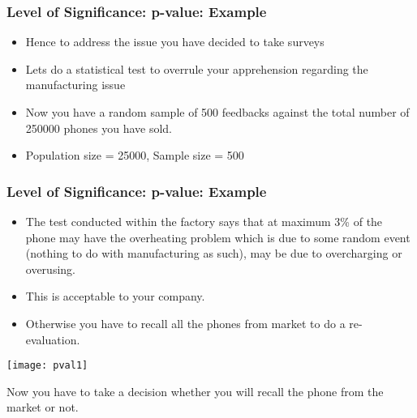 \begin{frame}[fragile]\frametitle{Level of Significance: p-value: Example}

\begin{itemize}
\item Hence to address the issue you have decided to take surveys
\item Lets do a statistical test to overrule your apprehension regarding the manufacturing issue
\item Now you have a random sample of 500 feedbacks against the total number of 250000 phones you have sold.
\item Population size = 25000, Sample size = 500
\end{itemize}


\end{frame}

\begin{frame}[fragile]\frametitle{Level of Significance: p-value: Example}

\begin{itemize}
\item The test conducted within the factory says that at maximum 3\% of the phone may have the overheating problem which is due to some random event (nothing to do with manufacturing as such), may be due to overcharging or overusing.
\item This is acceptable to your company. 
\item Otherwise you have to recall all the phones from market to do a re-evaluation.
\end{itemize}

\begin{center}
\texttt{[image: pval1]}
\end{center}

Now you have to take a decision whether you will recall the phone from the market or not.


\end{frame}

